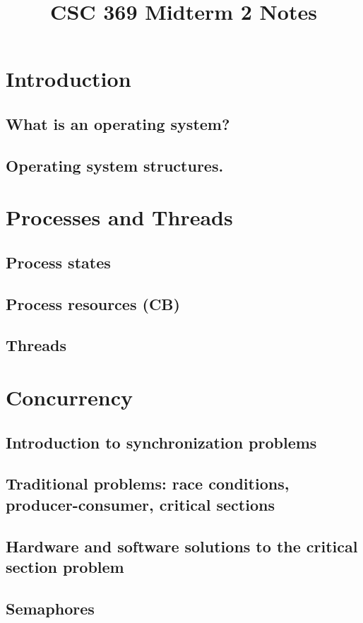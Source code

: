 \documentclass[12pt]{article}
\begin{document}
\title{CSC 369 Midterm 2 Notes}


\section{Introduction}
\subsection{What is an operating system?}
\subsection{Operating system structures.}

\bigskip

\section{Processes and Threads}
\subsection{Process states}
\subsection{Process resources (CB)}
\subsection{Threads}

\bigskip

\section{Concurrency}
\subsection{Introduction to synchronization problems}
\subsection{Traditional problems: race conditions, producer-consumer, critical sections}
\subsection{Hardware and software solutions to the critical section problem}
\subsection{Semaphores}
\end{document}
